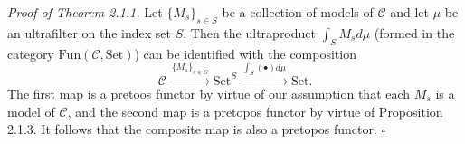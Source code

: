 
\noindent\textit{Proof of Theorem 2.1.1.} Let $\{M_s\}_{s\in S}$ be a collection of models of
$\mathcal{C}$ and let $\mu$ be an ultrafilter on the index
set $S$. Then the ultraproduct $\int_S M_s d\mu$ (formed in the category
$\mathrm{Fun}(\mathcal{C},\mathrm{Set})$) can be identified with the
composition
\[
\mathcal{C} \xrightarrow{\ \{M_s\}_{s\in S}\ } \mathrm{Set}^{S}
            \xrightarrow{\ \int_S(\bullet)d\mu\ } \mathrm{Set}.
\]
The first map is a pretoos functor by virtue of our assumption that each $M_s$ is a model of
$\mathcal{C}$, and the second
map is a pretopos functor by virtue of Proposition 2.1.3. It follows that the composite map is
also a pretopos
functor. \hfill$\square$

